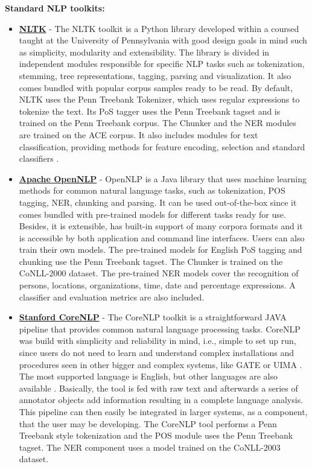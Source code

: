 \textbf{Standard NLP toolkits:}
\begin{itemize}
    \item \textbf{\href{http://www.nltk.org/}{NLTK}} - The NLTK toolkit is a Python library developed within a coursed taught at the University of Pennsylvania with good design goals in mind such as simplicity, modularity and extensibility. The library is divided in independent modules responsible for specific NLP tasks such as tokenization, stemming, tree representations, tagging, parsing and visualization. It also comes bundled with popular corpus samples ready to be read. By default, NLTK uses the Penn Treebank Tokenizer, which uses regular expressions to tokenize the text. Its PoS tagger uses the Penn Treebank tagset and is trained on the Penn Treebank corpus. %
The Chunker and the NER modules are trained on the ACE corpus. %
It also includes modules for text classification, providing methods for feature encoding, selection and standard classifiers \citep{Loper2002NLTK,Bird2006NLTK}.

    \item \textbf{\href{https://opennlp.apache.org}{Apache OpenNLP}} - OpenNLP is a Java library that uses machine learning methods for common natural language tasks, such as tokenization, POS tagging, NER, chunking and parsing. It can be used out-of-the-box since it comes bundled with pre-trained models for different tasks ready for use. Besides, it is extensible, has built-in support of many corpora formats and it is accessible by both application and command line interfaces. Users can also train their own models.%
The pre-trained models for English PoS tagging and chunking use the Penn Treebank tagset. The Chunker is trained on the CoNLL-2000 dataset. The pre-trained NER models cover the recognition of persons, locations, organizations, time, date and percentage expressions. A classifier and evaluation metrics are also included.

    \item \textbf{\href{http://stanfordnlp.github.io/CoreNLP}{Stanford CoreNLP}} - The CoreNLP toolkit is a straightforward JAVA pipeline that provides common natural language processing tasks.  CoreNLP was build with simplicity and reliability in mind, i.e., simple to set up run, since users do not need to learn and understand complex installations and procedures seen in other bigger and complex systems, like GATE \citep{Cunningham2002GATE} or UIMA \citep{Ferrucci2004UIMA}. The most supported language is English, but other languages are also available \cite{Manning2014CoreNLP}. Basically, the tool is fed with raw text and afterwards a series of annotator objects add information resulting in a complete language analysis. This pipeline can then easily be integrated in larger systems, as a component, that the user may be developing. The CoreNLP tool performs a Penn Treebank style tokenization and the POS module %
uses the Penn Treebank tagset. The NER %
component uses a model trained on the CoNLL-2003 dataset. 
    

\end{itemize}
